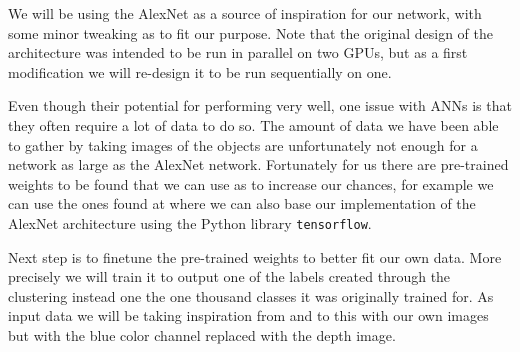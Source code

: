 We will be using the AlexNet as a source of inspiration for our network, with some minor tweaking as to fit our purpose. Note that the original design of the architecture was intended to be run in parallel on two GPUs, but as a first modification we will re-design it to be run sequentially on one.

Even though their potential for performing very well, one issue with ANNs is that they often require a lot of data to do so. The amount of data we have been able to gather by taking images of the objects are unfortunately not enough for a network as large as the AlexNet network. Fortunately for us there are pre-trained weights to be found that we can use as to increase our chances, for example we can use the ones found at \parencite{AlexNetImplWeights} where we can also base our implementation of the AlexNet architecture using the Python library \texttt{tensorflow}.

Next step is to finetune the pre-trained weights to better fit our own data. More precisely we will train it to output one of the labels created through the clustering instead one the one thousand classes it was originally trained for. As input data we will be taking inspiration from \parencite{Redmon2014} and to this with our own images but with the blue color channel replaced with the depth image.
